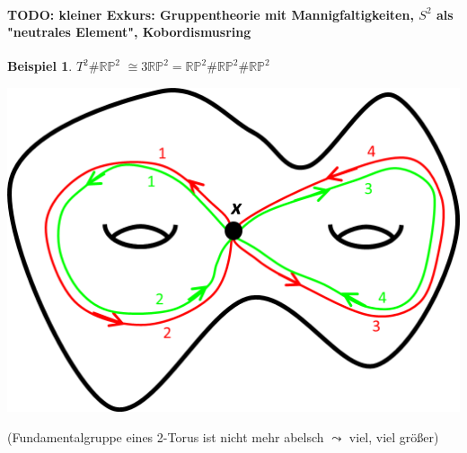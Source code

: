 \documentclass[a4paper,11pt,notitlepage]{report}
\theoremstyle{definition}
\newtheorem{example}{Beispiel}[chapter]
\newcommand{\R}{{\ensuremath{\mathbb{R}}}}
\newcommand{\Prim}{{\ensuremath{\mathbb{P}}}}
\begin{document}
\paragraph{TODO: kleiner Exkurs: Gruppentheorie mit Mannigfaltigkeiten, $S^2$ als "neutrales Element", Kobordismusring}

\begin{example}
	$T^2 \# \R \Prim^2$
	\newline
	$\cong 3 \R \Prim^2 = \R \Prim^2 \# \R \Prim^2 \# \R \Prim^2$
\end{example}
	 \begin{center}
	 	\includegraphics[scale=0.5]{images/2012_01_10_Bild17.png}
	 \end{center} (Fundamentalgruppe eines 2-Torus ist nicht mehr abelsch $\leadsto$ viel, viel größer)
\end{document}
